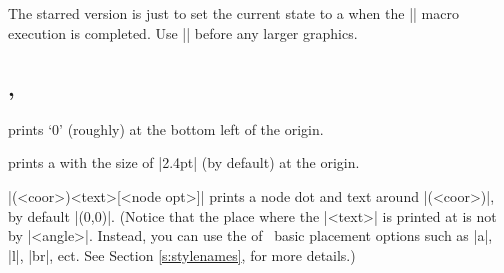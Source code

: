 \subsection{\protect\cmd{\tzaxes*}}
\label{ssi:tzaxes*}

The starred version \icmd{\tzaxes*} is just to set the current state to a  when the |\tzaxes| macro execution is completed. Use |\tzaxes*| before any larger graphics.

\begin{tzcode}{.3}
\end{tzcode}


\subsection{\protect\cmd{\tzshoworigin}, \protect\cmd{\tzshoworigin*}}
\label{ssi:tzshoworigin}

\icmd{\tzshoworigin} prints `$0$' (roughly) at the bottom left of the origin.

\begin{tzcode}{.3}
\end{tzcode}

\icmd{\tzshoworigin*} prints a  with the size of |2.4pt| (by default) at the origin.

\begin{tzcode}{.3}
\end{tzcode}

|\tzshoworigin*(<coor>){<text>}[<node opt>]| prints a node dot and text around |(<coor>)|, by default |(0,0)|. (Notice that the place where the |<text>| is printed at is not by |<angle>|. Instead, you can use the  of \Tikz\ basic placement options such as |a|, |l|, |br|, ect. See Section \ref{s:stylenames}, for more details.)

\begin{tzcode}{.3}
\end{tzcode}


